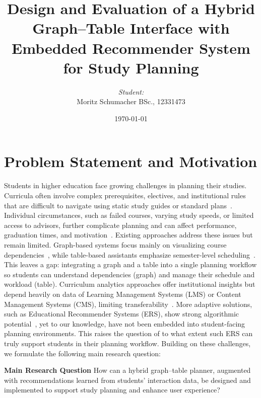 \documentclass[paper=a4,fontsize=11pt,oneside,titlepage]{scrartcl}
\title{Design and Evaluation of a Hybrid Graph–Table Interface with Embedded Recommender System for Study Planning}
\author{\textit{Student:}\\
Moritz Schumacher BSc., 12331473}
\date{\today}
\begin{document}
\thispagestyle{empty}
\maketitle
\newpage
\section{Problem Statement and Motivation}
\label{sec:problem}

Students in higher education face growing challenges in planning their studies. Curricula often involve complex prerequisites, electives, and institutional rules that are difficult to navigate using static study guides or standard plans~\cite{schulte_large_2017, morsy_study_2019}. Individual circumstances, such as failed courses, varying study speeds, or limited access to advisors, further complicate planning and can affect performance, graduation times, and motivation~\cite{wong_sequence_2018, chaturapruek_how_2018}.
Existing approaches address these issues but remain limited. Graph-based systems focus mainly on visualizing course dependencies~\cite{auvinen_stops_2014, rollande_graph_2013, trippel_developing_2025}, while table-based assistants emphasize semester-level scheduling~\cite{hirmer_requirements_2022, judel_supporting_2023, baucks_dashboard_2023}. This leaves a gap: integrating a graph and a table into a single planning workflow so students can understand dependencies (graph) and manage their schedule and workload (table).
Curriculum analytics approaches offer institutional insights but depend heavily on data of Learning Management Systems (LMS) or Content Management Systems (CMS), limiting transferability~\cite{schulte_large_2017, harden_curriculum_2001, archambault_curriculum_2015, buck-emden_analyse_2018, kapucu_competency-based_2017}. More adaptive solutions, such as Educational Recommender Systems (ERS), show strong algorithmic potential~\cite{bhumichitr_recommender_2017, wong_sequence_2018, esteban_helping_2020, srisamutr_course_2018, al-badarenah_automated_2016}, yet to our knowledge, have not been embedded into student-facing planning environments. This raises the question of to what extent such ERS can truly support students in their planning workflow. Building on these challenges, we formulate the following main research question:

\textbf{Main Research Question} How can a hybrid graph–table planner, augmented with recommendations learned from students’ interaction data, be designed and implemented to support study planning and enhance user experience?
\end{document}
